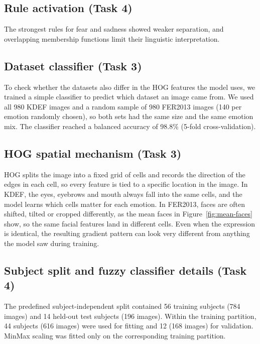 \FloatBarrier
\subsection{Rule activation (Task 4)}
\label{app:rule-activation}
The strongest rules for fear and sadness showed weaker separation, and overlapping membership functions limit their linguistic interpretation.

\FloatBarrier
\subsection{Dataset classifier (Task 3)}
\label{app:dataset-clf}
To check whether the datasets also differ in the HOG features the model uses, we trained a simple classifier to predict which dataset an image came from. We used all 980 KDEF images and a random sample of 980 FER2013 images (140 per emotion randomly chosen), so both sets had the same size and the same emotion mix. The classifier reached a balanced accuracy of 98.8\% (5-fold cross-validation).

\FloatBarrier
\subsection{HOG spatial mechanism (Task 3)}
\label{app:hog-shift}
HOG splits the image into a fixed grid of cells and records the direction of the edges in each cell, so every feature is tied to a specific location in the image. In KDEF, the eyes, eyebrows and mouth always fall into the same cells, and the model learns which cells matter for each emotion. In FER2013, faces are often shifted, tilted or cropped differently, as the mean faces in Figure~\ref{fig:mean-faces} show, so the same facial features land in different cells. Even when the expression is identical, the resulting gradient pattern can look very different from anything the model saw during training.

\FloatBarrier
\subsection{Subject split and fuzzy classifier details (Task 4)}
\label{app:fuzzy-split}
The predefined subject-independent split contained 56 training subjects (784 images) and 14 held-out test subjects (196 images). Within the training partition, 44 subjects (616 images) were used for fitting and 12 (168 images) for validation. MinMax scaling was fitted only on the corresponding training partition.

